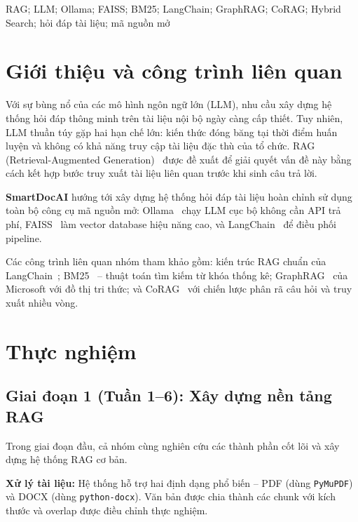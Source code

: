 \documentclass[10pt, conference, a4paper, compsocconf]{IEEEtran}
\begin{document}
\begin{IEEEkeywords}
RAG; LLM; Ollama; FAISS; BM25; LangChain; GraphRAG; CoRAG;
Hybrid Search; hỏi đáp tài liệu; mã nguồn mở
\end{IEEEkeywords}

\IEEEpeerreviewmaketitle

\section{Giới thiệu và công trình liên quan}

Với sự bùng nổ của các mô hình ngôn ngữ lớn (LLM), nhu cầu xây dựng hệ
thống hỏi đáp thông minh trên tài liệu nội bộ ngày càng cấp thiết. Tuy
nhiên, LLM thuần túy gặp hai hạn chế lớn: kiến thức đóng băng tại thời
điểm huấn luyện và không có khả năng truy cập tài liệu đặc thù của tổ
chức. RAG (Retrieval-Augmented Generation)~\cite{lewis2020rag} được đề xuất
để giải quyết vấn đề này bằng cách kết hợp bước truy xuất tài liệu liên
quan trước khi sinh câu trả lời.

\textbf{SmartDocAI} hướng tới xây dựng hệ thống hỏi đáp tài liệu hoàn
chỉnh sử dụng toàn bộ công cụ mã nguồn mở: Ollama~\cite{ollama} chạy LLM
cục bộ không cần API trả phí, FAISS~\cite{johnson2019faiss} làm vector
database hiệu năng cao, và LangChain~\cite{langchain} để điều phối pipeline.

Các công trình liên quan nhóm tham khảo gồm: kiến trúc RAG chuẩn của
LangChain~\cite{langchain}; BM25~\cite{robertson2009bm25} -- thuật toán tìm
kiếm từ khóa thống kê; GraphRAG~\cite{edge2024graphrag} của Microsoft với
đồ thị tri thức; và CoRAG~\cite{wang2024corag} với chiến lược phân rã câu
hỏi và truy xuất nhiều vòng.

\section{Thực nghiệm}

\subsection{Giai đoạn 1 (Tuần 1--6): Xây dựng nền tảng RAG}

Trong giai đoạn đầu, cả nhóm cùng nghiên cứu các thành phần cốt lõi và
xây dựng hệ thống RAG cơ bản.

\textbf{Xử lý tài liệu:} Hệ thống hỗ trợ hai định dạng phổ biến -- PDF
(dùng \texttt{PyMuPDF}) và DOCX (dùng \texttt{python-docx}). Văn bản được
chia thành các chunk với kích thước và overlap được điều chỉnh thực nghiệm.
\end{document}
